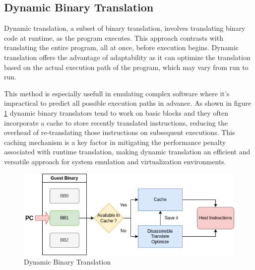 \subsection{Dynamic Binary Translation}
Dynamic translation, a subset of binary translation, involves translating binary code at runtime, as the program executes.
This approach contrasts with translating the entire program, all at once, before execution begins.
Dynamic translation offers the advantage of adaptability as it can optimize the translation based on the actual execution path of the program, which may vary from run to run.

This method is especially usefull in emulating complex software where it's impractical to predict all possible execution paths in advance.
As shown in figure \ref{fig:dynamic_binary_translation} dynamic binary translators tend to work on basic blocks and they often incorporate a cache to store recently translated instructions, reducing the overhead of re-translating those instructions on subsequent executions. 
This caching mechanism is a key factor in mitigating the performance penalty associated with runtime translation, making dynamic translation an efficient and versatile approach for system emulation and virtualization environments.
\begin{figure}[ht]
    \centering
    \includegraphics[width=0.8\linewidth]{figures/dyn_bin_trans}
    \caption{Dynamic Binary Translation}
    \label{fig:dynamic_binary_translation}
\end{figure}

